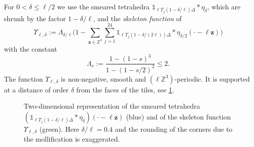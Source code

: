 \documentclass[final,reqno]{amsart}
\theoremstyle{remark}
\renewcommand{\le}{\leqslant}
\newcommand{\ZZ}{\mathbb{Z}}
\newcommand{\iden}{\mathbb{1}}
\newcommand{\tetra}{\mathbb{\Delta}}
\begin{document}
For $0<\delta\le\ell/2$ we use the smeared tetrahedra $\iden_{\ell T_j(1-\delta/\ell)\tetra}\ast\eta_\delta$, which are shrunk by the factor $1-\delta/\ell$, and the \emph{skeleton function} of~\cite{csirik2026non}
\begin{equation*}
 \boxed{\Upsilon_{\ell,\delta}:=\Lambda_{\delta/\ell}\Bigg(1-\sum_{\mathbf{z}\in\ZZ^3}\sum_{j=1}^{24}\iden_{\ell T_j(1-\delta/(2\ell))\tetra}\ast \eta_{\delta/2}(\cdot-\ell \mathbf{z})\Bigg)}
\end{equation*}
with the constant
$$
\Lambda_s:=\frac{1-(1-s)^3}{1-(1-s/2)^3}\le2.
$$
The function $\Upsilon_{\ell,\delta}$ is non-negative, smooth and $(\ell\ZZ^3)$-periodic. It is supported at a distance of order $\delta$ from the faces of the tiles, see \cref{fig:skeleton}.

\begin{figure}[t]
\centering
{}
\caption{Two-dimensional representation of the smeared tetrahedra $(\iden_{\ell T_j(1-\delta/\ell)\tetra}\ast\eta_\delta)(\cdot-\ell\mathbf{z})$ (blue) and of the skeleton function $\Upsilon_{\ell,\delta}$ (green). Here $\delta/\ell=0.4$ and the rounding of the corners due to the mollification is exaggerated.}\label{fig:skeleton}
\end{figure}
\end{document}

